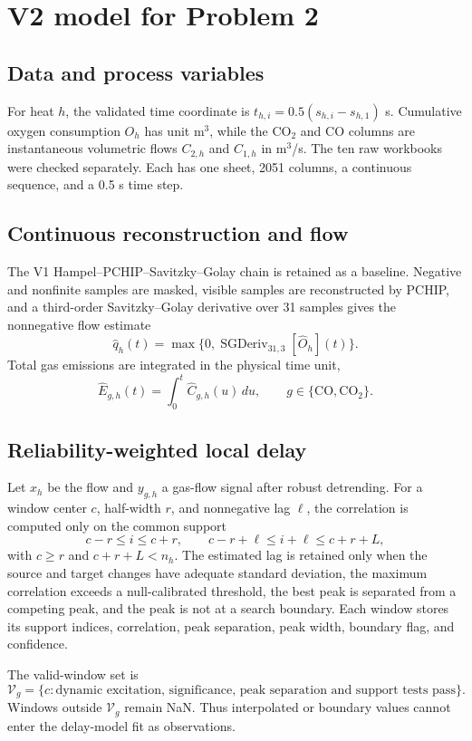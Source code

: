 \section{V2 model for Problem 2}
\label{sec:problem2-v2}

\subsection{Data and process variables}
For heat $h$, the validated time coordinate is $t_{h,i}=0.5(s_{h,i}-s_{h,1})$ s. Cumulative oxygen consumption $O_h$ has unit m$^3$, while the CO$_2$ and CO columns are instantaneous volumetric flows $C_{2,h}$ and $C_{1,h}$ in m$^3$/s. The ten raw workbooks were checked separately. Each has one sheet, 2051 columns, a continuous sequence, and a 0.5 s time step.

\subsection{Continuous reconstruction and flow}
The V1 Hampel--PCHIP--Savitzky--Golay chain is retained as a baseline. Negative and nonfinite samples are masked, visible samples are reconstructed by PCHIP, and a third-order Savitzky--Golay derivative over 31 samples gives the nonnegative flow estimate
\[
\widehat q_h(t)=\max\{0,\operatorname{SGDeriv}_{31,3}[\widehat O_h](t)\}.
\]
Total gas emissions are integrated in the physical time unit,
\[
\widehat E_{g,h}(t)=\int_0^t\widehat C_{g,h}(u)\,du,\qquad g\in\{\mathrm{CO},\mathrm{CO_2}\}.
\]

\subsection{Reliability-weighted local delay}
Let $x_h$ be the flow and $y_{g,h}$ a gas-flow signal after robust detrending. For a window center $c$, half-width $r$, and nonnegative lag $\ell$, the correlation is computed only on the common support
\[
 c-r\leq i\leq c+r,\qquad c-r+\ell\leq i+\ell\leq c+r+L,
\]
with $c\geq r$ and $c+r+L<n_h$. The estimated lag is retained only when the source and target changes have adequate standard deviation, the maximum correlation exceeds a null-calibrated threshold, the best peak is separated from a competing peak, and the peak is not at a search boundary. Each window stores its support indices, correlation, peak separation, peak width, boundary flag, and confidence.

The valid-window set is
\[
\mathcal V_g=\{c:\text{dynamic excitation, significance, peak separation and support tests pass}\}.
\]
Windows outside $\mathcal V_g$ remain NaN. Thus interpolated or boundary values cannot enter the delay-model fit as observations.

